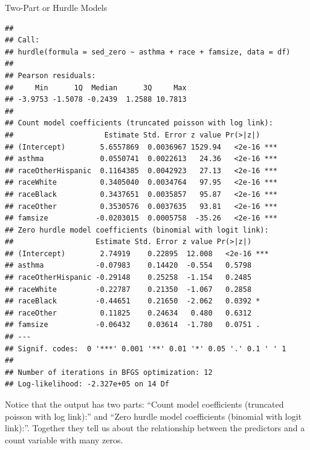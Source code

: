\begin{frame}[fragile]{Two-Part or Hurdle Models}
\begin{verbatim}
## 
## Call:
## hurdle(formula = sed_zero ~ asthma + race + famsize, data = df)
## 
## Pearson residuals:
##     Min      1Q  Median      3Q     Max 
## -3.9753 -1.5078 -0.2439  1.2588 10.7813 
## 
## Count model coefficients (truncated poisson with log link):
##                     Estimate Std. Error z value Pr(>|z|)    
## (Intercept)        5.6557869  0.0036967 1529.94   <2e-16 ***
## asthma             0.0550741  0.0022613   24.36   <2e-16 ***
## raceOtherHispanic  0.1164385  0.0042923   27.13   <2e-16 ***
## raceWhite          0.3405040  0.0034764   97.95   <2e-16 ***
## raceBlack          0.3437651  0.0035857   95.87   <2e-16 ***
## raceOther          0.3530576  0.0037635   93.81   <2e-16 ***
## famsize           -0.0203015  0.0005758  -35.26   <2e-16 ***
## Zero hurdle model coefficients (binomial with logit link):
##                   Estimate Std. Error z value Pr(>|z|)    
## (Intercept)        2.74919    0.22895  12.008   <2e-16 ***
## asthma            -0.07983    0.14420  -0.554   0.5798    
## raceOtherHispanic -0.29148    0.25258  -1.154   0.2485    
## raceWhite         -0.22787    0.21350  -1.067   0.2858    
## raceBlack         -0.44651    0.21650  -2.062   0.0392 *  
## raceOther          0.11825    0.24634   0.480   0.6312    
## famsize           -0.06432    0.03614  -1.780   0.0751 .  
## ---
## Signif. codes:  0 '***' 0.001 '**' 0.01 '*' 0.05 '.' 0.1 ' ' 1 
## 
## Number of iterations in BFGS optimization: 12 
## Log-likelihood: -2.327e+05 on 14 Df
\end{verbatim}

\normalsize

Notice that the output has two parts: ``Count model coefficients
(truncated poisson with log link):'' and ``Zero hurdle model
coefficients (binomial with logit link):''. Together they tell us about
the relationship between the predictors and a count variable with many
zeros.

\end{frame}

